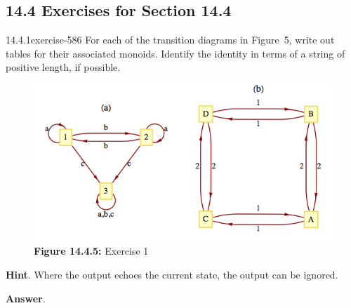\documentclass[twoside,10pt,]{book}
\numberwithin{equation}{section}
\begin{document}
\subsection*{14.4 Exercises for Section 14.4}
\begin{divisionsolution}{14.4.1}{}{exercise-586}%
\hypertarget{p-5262}{}%
For each of the transition diagrams in Figure~5, write out tables for their associated monoids. Identify the identity in terms of a string of positive length, if possible.%
\begin{figure}
\centering
\includegraphics[width=0.7\linewidth]{images/fig-exercise-14-4-1.png}
\caption*{\textbf{Figure 14.4.5:} Exercise 1}
\end{figure}
\par\smallskip%
\noindent\textbf{Hint}.\quad%
\hypertarget{p-5263}{}%
Where the output echoes the current state, the output can be ignored.%
\par\smallskip%
\noindent\textbf{Answer}.\quad%
\hypertarget{p-5264}{}%
\leavevmode%
\end{divisionsolution}
\end{document}

